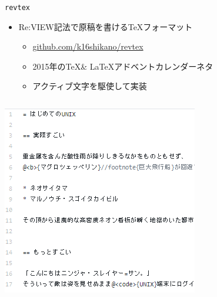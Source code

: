 \documentclass[14pt,dvipdfmx,uplatex]{beamer}
\begin{document}
\begin{frame}[t]{\inhibitglue \texttt{revtex}}
  \sffamily
  \begin{itemize}
    \item Re:VIEW記法で原稿を書ける\TeX フォーマット
    \begin{itemize}
      \item \href{https://github.com/k16shikano/revtex}{github.com/k16shikano/revtex}
      \item 2015年の\TeX \& \LaTeX アドベントカレンダーネタ
      \item アクティブ文字を駆使して実装
    \end{itemize}
  \end{itemize}
  \begin{center}
    \begin{columns}[c]
      \begin{column}{.4\textwidth}
      \includegraphics[width=\textwidth]{figures/revtex-input.png}
      \end{column}
      \begin{column}{.3\textwidth}

\end{column}
\end{columns}
\end{center}
\end{frame}
\end{document}
